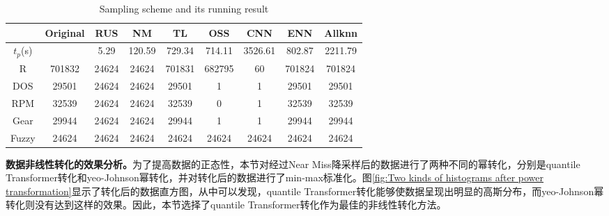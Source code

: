 \begin{table}[!ht]
    \centering
    \caption{Sampling scheme and its running result}
    \begin{tabular}{ccccccccc}
    \hline
        \textbf{} & \textbf{Original} & \textbf{RUS} & \textbf{NM} & \textbf{TL} & \textbf{OSS} & \textbf{CNN} & \textbf{ENN} & \textbf{Allknn} \\ \hline
        $t_p$(s)  & ~ & 5.29 & 120.59 & 729.34 & 714.11 & 3526.61 & 802.87 & 2211.79 \\ 
        R & 701832 & 24624 & 24624 & 701831 & 682795 & 60 & 701824 & 701824 \\ 
        DOS & 29501 & 24624 & 24624 & 29501 & 1 & 1 & 29501 & 29501 \\ 
        RPM & 32539 & 24624 & 24624 & 32539 & 0 & 1 & 32539 & 32539 \\ 
        Gear & 29944 & 24624 & 24624 & 29944 & 1 & 1 & 29944 & 29944 \\ 
        Fuzzy & 24624 & 24624 & 24624 & 24624 & 24624 & 24624 & 24624 & 24624 \\ \hline
    \end{tabular}
    \label{table:Sampling scheme and its running result}
\end{table}

\textbf{数据非线性转化的效果分析。}\label{subsection:Nonlinear_transformation _of_data}为了提高数据的正态性，本节对经过Near Miss降采样后的数据进行了两种不同的幂转化，分别是quantile Transformer转化和yeo-Johnson幂转化，并对转化后的数据进行了min-max标准化。图\ref{fig:Two kinds of histograms after power transformation}显示了转化后的数据直方图，从中可以发现，quantile Transformer转化能够使数据呈现出明显的高斯分布，而yeo-Johnson幂转化则没有达到这样的效果。因此，本节选择了quantile Transformer转化作为最佳的非线性转化方法。

